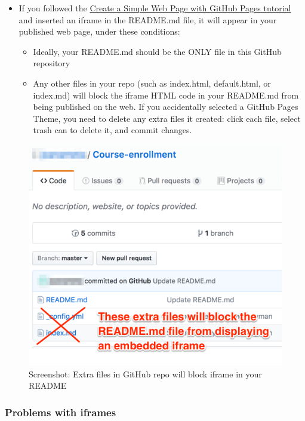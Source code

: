 \documentclass[
  english,
]{book}
\providecommand{\tightlist}{%
  \setlength{\itemsep}{0pt}\setlength{\parskip}{0pt}}
\begin{document}
\begin{itemize}
\tightlist
\item
  If you followed the \href{github-pages}{Create a Simple Web Page with GitHub Pages tutorial} and inserted an iframe in the README.md file, it will appear in your published web page, under these conditions:

  \begin{itemize}
  \tightlist
  \item
    Ideally, your README.md should be the ONLY file in this GitHub repository
  \item
    Any other files in your repo (such as index.html, default.html, or index.md) will block the iframe HTML code in your README.md from being published on the web. If you accidentally selected a GitHub Pages Theme, you need to delete any extra files it created: click each file, select trash can to delete it, and commit changes.
  \end{itemize}
\end{itemize}

\begin{figure}
\centering
\includegraphics{images/08-github/extra-files-block-readme-iframe.png}
\caption{Screenshot: Extra files in GitHub repo will block iframe in your README}
\end{figure}

\hypertarget{problems-with-iframes}{%
\subsubsection*{Problems with iframes}\label{problems-with-iframes}}
\end{document}

